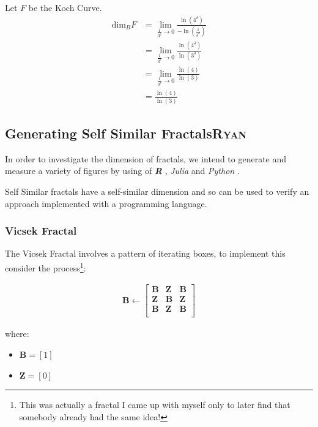 \documentclass[a4paper,11pt,twoside]{article}
\begin{document}
Let \(F\) be the Koch Curve.
\begin{align*}
\text{dim}_BF &= \lim_{\frac{1}{3^{\delta}} \to 0} \frac{\ln(4^{\delta})}{-\ln(\frac{1}{3^{\delta}})}\\
&= \lim_{\frac{1}{3^{\delta}} \to 0} \frac{\ln(4^{\delta})}{\ln(3^{\delta})}\\
&= \lim_{\frac{1}{3^{\delta}} \to 0} \frac{\ln(4)}{\ln(3)}\\
&= \frac{\ln(4)}{\ln(3)}
\end{align*}
\subsection{Generating Self Similar Fractals\hfill{}\textsc{Ryan}}
\label{gen-self-sim-frac}
In order to investigate the dimension of fractals, we intend to generate and measure a variety of figures by using of \textbf{\emph{R}} \cite{rcoreteamLanguageEnvironmentStatistical2020}, \emph{Julia} \cite{bezansonJuliaFreshApproach2017} and \emph{Python} \cite{WelcomePythonOrg}.

Self Similar fractals have a self-similar dimension and so can be used to verify an approach implemented with a programming language.
\subsubsection{Vicsek Fractal}
\label{vicsek-fractal}
The Vicsek Fractal \cite[p. 12]{vicsekFractalGrowthPhenomena1992} involves a pattern of iterating boxes, to implement this consider the process\footnote{This was actually a fractal I came up with myself only to later find that somebody already had the same idea!}:



\begin{align}
\mathbf{B} \leftarrow
   \begin{bmatrix}
       \mathbf{B} & \mathbf{Z} & \mathbf{B} \\
       \mathbf{Z} & \mathbf{B} & \mathbf{Z} \\
       \mathbf{B} & \mathbf{Z} & \mathbf{B} \\
   \end{bmatrix} \label{eq:visek-iter}
\end{align}

where:

\begin{itemize}
\item \(\mathbf{B}= \left[ 1 \right]\)
\item \(\mathbf{Z}= \left[ 0 \right]\)
\end{itemize}
\end{document}
